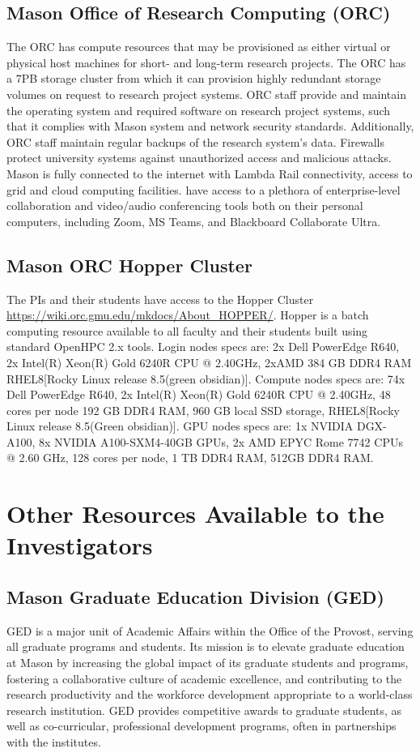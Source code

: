 \documentclass[11pt]{article}
\begin{document}
\subsection*{Mason Office of Research Computing (ORC)} The ORC has compute resources that may be provisioned as either virtual or physical host machines for short- and long-term research projects. The ORC has a $7$PB storage cluster from which it can provision highly redundant storage volumes on request to research project systems. ORC staff provide and maintain the operating system and required software on research project systems, such that it complies with Mason system and network security standards. Additionally, ORC staff maintain regular backups of the research system’s data. Firewalls protect university systems against unauthorized access and malicious attacks. Mason is fully connected to the internet with Lambda Rail connectivity, access to grid and cloud computing facilities. have access to a plethora of enterprise-level collaboration and video/audio conferencing tools both on their personal computers, including Zoom, MS Teams, and Blackboard Collaborate Ultra. 	

\subsection*{Mason ORC Hopper Cluster} The PIs and their students have access to the Hopper Cluster \url{https://wiki.orc.gmu.edu/mkdocs/About_HOPPER/}. Hopper is a batch computing resource available to all faculty and their students built using standard OpenHPC 2.x tools. Login nodes specs are: 2x Dell PowerEdge R640, 2x Intel(R) Xeon(R) Gold 6240R CPU @ 2.40GHz, 2xAMD 384 GB DDR4 RAM RHEL8[Rocky Linux release 8.5(green obsidian)]. Compute nodes specs are: 74x Dell PowerEdge R640,
2x Intel(R) Xeon(R) Gold 6240R CPU @ 2.40GHz, 48 cores per node
192 GB DDR4 RAM, 960 GB local SSD storage, RHEL8[Rocky Linux release 8.5(Green obsidian)]. GPU nodes specs are: 1x NVIDIA DGX-A100, 8x NVIDIA A100-SXM4-40GB GPUs, 2x AMD EPYC Rome 7742 CPUs @ 2.60 GHz, 128 cores per node, 1 TB DDR4 RAM, 512GB DDR4 RAM.

\section*{Other Resources Available to the Investigators}

\subsection*{Mason Graduate Education Division (GED)} GED is a major unit of Academic Affairs within the Office of the Provost, serving all graduate programs and students. Its mission is to elevate graduate education at Mason by increasing the global impact of its graduate students and programs, fostering a collaborative culture of academic excellence, and contributing to the research productivity and the workforce development appropriate to a world-class research institution. GED provides competitive awards to graduate students, as well as co-curricular, professional development programs, often in partnerships with the institutes.
\end{document}
